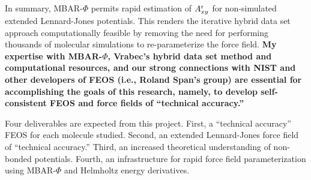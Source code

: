 \documentclass[12pt,a4paper]{article}
\begin{document}
In summary, MBAR-$\Phi$ permits rapid estimation of $A_{xy}^{\rm r}$ for non-simulated extended Lennard-Jones potentials. This renders the iterative hybrid data set approach computationally feasible by removing the need for performing thousands of molecular simulations to re-parameterize the force field. \textbf{My expertise with MBAR-$\Phi$, Vrabec's hybrid data set method and computational resources, and our strong connections with NIST and other developers of FEOS (i.e., Roland Span's group) are essential for accomplishing the goals of this research, namely, to develop self-consistent FEOS and force fields of ``technical accuracy.''} 


Four deliverables are expected from this project. First, a ``technical accuracy'' FEOS for each molecule studied. Second, an extended Lennard-Jones force field of ``technical accuracy.'' Third, an increased theoretical understanding of non-bonded potentials. Fourth, an infrastructure for rapid force field parameterization using MBAR-$\Phi$ and Helmholtz energy derivatives. 


\end{document}
